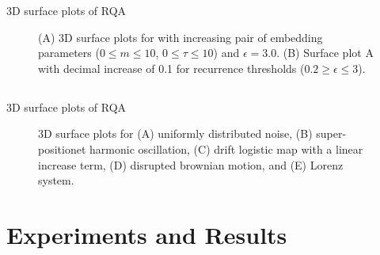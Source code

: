 {{{\begin{frame}{3D surface plots of RQA}

    \begin{figure}
	\caption{(A) 3D surface plots for 
	with increasing pair of embedding parameters 
	($0 \le m \le 10$, $0 \le \tau \le 10$) and $\epsilon=3.0$.
	(B) Surface plot A with decimal increase of 0.1 
	for recurrence thresholds ($ 0.2 \ge \epsilon \le 3 $).
	} 
   \end{figure}
		
\end{frame}
}



\subsection{}
{

\begin{frame}{3D surface plots of RQA}

    \begin{figure}
	\caption{3D surface plots for 
		(A) uniformly distributed noise,
		(B) super-positionet harmonic oscillation,
		(C) drift logistic map with a linear increase term,
		(D) disrupted brownian motion, and
		(E) Lorenz system.
		} 
   \end{figure}
		
\end{frame}
}













\section{Experiments and Results}

\subsection{}
{

}}}

